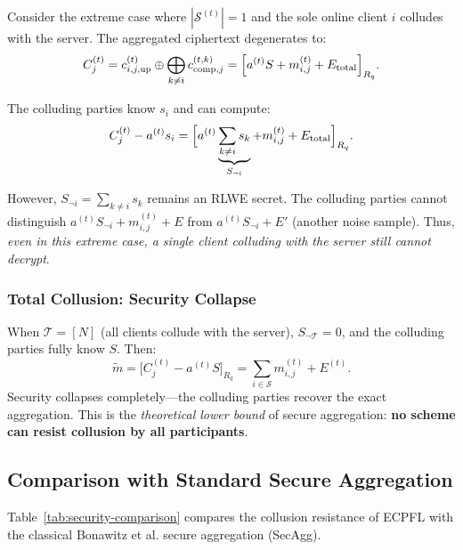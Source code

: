 Consider the extreme case where $|\mathcal{S}^{(t)}| = 1$ and the sole online client $i$ colludes with the server. The aggregated ciphertext degenerates to:
\begin{equation}
    C_j^{(t)} = c_{i,j,\mathrm{up}}^{(t)} \oplus \bigoplus_{k \neq i} c_{\mathrm{comp},j}^{(t,k)} = \Bigl[ a^{(t)} S + m_{i,j}^{(t)} + E_{\mathrm{total}} \Bigr]_{R_q}.
\end{equation}

The colluding parties know $s_i$ and can compute:
\begin{equation}
    C_j^{(t)} - a^{(t)} s_i = \Bigl[ a^{(t)} \underbrace{\sum_{k \neq i} s_k}_{S_{\neg i}} + m_{i,j}^{(t)} + E_{\mathrm{total}} \Bigr]_{R_q}.
\end{equation}

However, $S_{\neg i} = \sum_{k \neq i} s_k$ remains an RLWE secret. The colluding parties cannot distinguish $a^{(t)} S_{\neg i} + m_{i,j}^{(t)} + E$ from $a^{(t)} S_{\neg i} + E'$ (another noise sample). Thus, \emph{even in this extreme case, a single client colluding with the server still cannot decrypt}.

\subsubsection{Total Collusion: Security Collapse}

When $\mathcal{T} = [N]$ (all clients collude with the server), $S_{\neg\mathcal{T}} = 0$, and the colluding parties fully know $S$. Then:
\begin{equation}
    \tilde{m} = \bigl[ C_j^{(t)} - a^{(t)} S \bigr]_{R_q} = \sum_{i \in \mathcal{S}} m_{i,j}^{(t)} + E^{(t)}.
\end{equation}
Security collapses completely---the colluding parties recover the exact aggregation. This is the \emph{theoretical lower bound} of secure aggregation: \textbf{no scheme can resist collusion by all participants}.

\subsection{Comparison with Standard Secure Aggregation}
\label{ssec:comparison}

Table~\ref{tab:security-comparison} compares the collusion resistance of \textsc{ECPFL} with the classical Bonawitz et al. secure aggregation (SecAgg).

